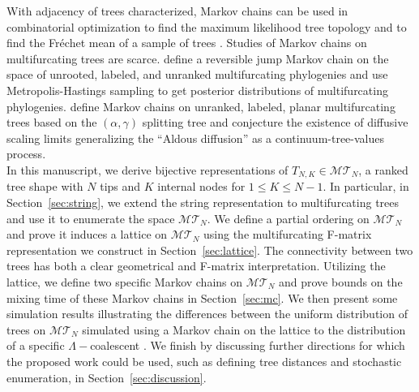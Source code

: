 \documentclass{article}
\begin{document}
With adjacency of trees characterized, Markov chains can be used in combinatorial optimization to find the maximum likelihood tree topology  \citep{friedman2001structural} and to find the Fr\'{e}chet mean of a sample of trees \citep{samyak2024statistical}. Studies of Markov chains on multifurcating trees are scarce. \cite{lewis2005polytomies} define a reversible jump Markov chain on the space of unrooted, labeled, and unranked multifurcating phylogenies and use Metropolis-Hastings sampling to get posterior distributions of multifurcating phylogenies. %
\cite{sorensen2024down} define Markov chains on unranked, labeled, planar multifurcating trees based on the $(\alpha, \gamma)$ splitting tree \citep{haas2008, chen2009} and conjecture the existence of diffusive scaling limits generalizing the ``Aldous diffusion'' as a continuum-tree-values process. \\

In this manuscript, we derive bijective representations of $T_{N,K} \in \mathcal{MT}_N$, a ranked tree shape with $N$ tips and $K$ internal nodes for $1 \leq K \leq N-1$. In particular, in Section~\ref{sec:string}, we extend the string representation \citep{donaghey1975alternating} to multifurcating trees and use it to enumerate the space $\mathcal{MT}_N$. We define a partial ordering on $\mathcal{MT}_N$ and prove it induces a lattice on $\mathcal{MT}_N$ using the multifurcating F-matrix representation we construct in Section~\ref{sec:lattice}. The connectivity between two trees has both a clear geometrical and F-matrix interpretation. Utilizing the lattice, we define two specific Markov chains on $\mathcal{MT}_N$ and prove bounds on the mixing time of these Markov chains in Section~\ref{sec:mc}. We then present some simulation results illustrating the differences between the uniform distribution of trees on $\mathcal{MT}_N$ simulated using a Markov chain on the lattice to the distribution of a specific $\Lambda-$coalescent \citep{pitman1999coalescents, sagitov1999general}. We finish by discussing further directions for which the proposed work could be used, such as defining tree distances and stochastic enumeration, in Section~\ref{sec:discussion}. 
\end{document}

